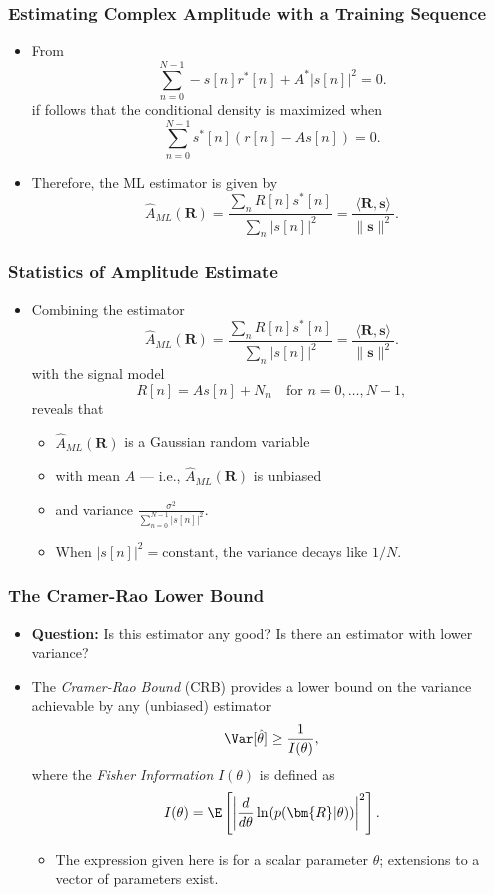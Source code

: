 \begin{frame}
  \frametitle{Estimating Complex Amplitude with a Training Sequence}
  \begin{itemize}
  \item From
    \[
      \sum_{n=0}^{N-1} -s[n]r^*[n] + A^* |s[n]|^2 = 0.
    \]
    if follows that the conditional density is maximized when
     \[
       \sum_{n=0}^{N-1} s^*[n] (r[n] -As[n]) = 0.
     \]
   \item Therefore, the ML estimator is given by
     \[
       \hat{A}_{ML}(\bm{R}) =
       \frac{\sum_n R[n] s^*[n]}{\sum_n  |s[n]|^2} =
       \frac{\langle \bm{R}, \bm{s} \rangle}{\|\bm{s}\|^2}.
     \]
  \end{itemize}
\end{frame}



\begin{frame}
  \frametitle{Statistics of Amplitude Estimate}
  \begin{itemize}
    \item Combining the estimator
    \[
      \hat{A}_{ML}(\bm{R}) =
      \frac{\sum_n R[n] s^*[n]}{\sum_n  |s[n]|^2} =
      \frac{\langle \bm{R}, \bm{s} \rangle}{\|\bm{s}\|^2}.
    \]
    with the signal model
    \[
      R[n] = A s[n] + N_n \quad \text{for $n=0, \ldots, N-1$},
    \]
    reveals that
    \begin{itemize}
    \item $\hat{A}_{ML}(\bm{R})$ is a Gaussian random variable
    \item with mean $A$ --- i.e., $\hat{A}_{ML}(\bm{R})$ is unbiased
    \item and variance $\frac{\sigma^2}{\sum_{n=0}^{N-1} |s[n]|^2}$.
    \end{itemize}
    \begin{itemize}
    \item When $|s[n]|^2 = \text{constant}$,  the variance decays like $1/N$.
    \end{itemize}
  \end{itemize}
\end{frame}

\begin{frame}
  \frametitle{The Cramer-Rao Lower Bound}
  \begin{itemize}
  \item \textbf{Question:} Is this estimator any good? Is there an
    estimator with lower variance?
  \item The \emph{Cramer-Rao Bound} (CRB) provides a lower bound on the
    variance achievable by any (unbiased) estimator
    \[
      \Var[\hat{\theta}] \geq \frac{1}{I(\theta)},
    \]
    where the \emph{Fisher Information} $I(\theta)$ is defined as
    \[
      I(\theta) = \E\left[{\left|
        \frac{d}{d\theta} \ln(p(\bm{R} | \theta)) \right|}^2
        \right].
    \]
    \begin{itemize}
    \item The expression given here is for a scalar parameter
      $\theta$; extensions to a vector of parameters exist.
    \end{itemize}
  \end{itemize}
\end{frame}

